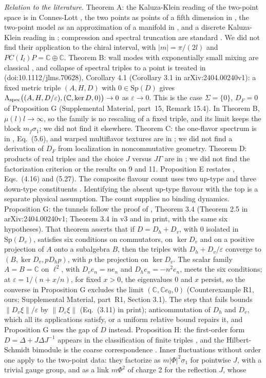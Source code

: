 \documentclass[aps,prd,reprint,onecolumn,nofootinbib,amsmath,amssymb,floatfix]{revtex4-2}
\theoremstyle{plain}
\newcommand{\supp}[1]{Supplemental Material, part~#1}
\newcommand{\Lspec}{\Lambda_{\rm spec}}
\newcommand{\C}{\mathbb C}
\begin{document}
\emph{Relation to the literature.} Theorem A: the Kaluza-Klein reading of the two-point space is in Connes-Lott \cite{ConnesLott1991}, the two points as points of a fifth dimension in \cite{VW1996}, the two-point model as an approximation of a manifold in \cite{DMH1994}, and a discrete Kaluza-Klein reading in \cite{MW2002}; compression and spectral truncation are standard \cite{DLM2014,CvS2021}. We did not find their application to the chiral interval, with $|m|=\pi/(2l)$ and $PC(I_l)P=\C\oplus\C$. Theorem B: wall modes with exponentially small mixing are classical \cite{JR1976,Kaplan1992,Shamir1993}, and collapse of spectral triples to a point is treated in \cite{FL2026} (doi:10.1112/jlms.70628), Corollary 4.1 (Corollary 3.1 in arXiv:2404.00240v1): a fixed metric triple $(A,H,D)$ with $0\in\mathrm{Sp}(D)$ gives $\Lspec\bigl((A,H,D/\varepsilon),(\C,\ker D,0)\bigr)\to0$ as $\varepsilon\to0$. This is the case $\Sigma=\{0\}$, $D_F=0$ of Proposition G (\supp{15}, Remark 15.4). In Theorem B, $\mu(l)l\to\infty$, so the family is no rescaling of a fixed triple, and its limit keeps the block $m_f\sigma_1$; we did not find it elsewhere. Theorem C: the one-flavor spectrum is in \cite{Csaki2004}, Eq.~(5.6), and warped multiflavor textures are in \cite{Cas2008}; we did not find a derivation of $D_F$ from localization in noncommutative geometry. Theorem D: products of real triples and the choice $J$ versus $J\Gamma$ are in \cite{DD2011,VdSS2012}; we did not find the factorization criterion or the results on 9 and 11. Proposition E restates \cite{CCM2007}, Eqs.~(4.16) and (5.27). The composite flavour count uses two up-type and three down-type constituents \cite{Rivero2005}. Identifying the absent up-type flavour with the top is a separate physical assumption. The count supplies no binding dynamics. Proposition G: the tunnels follow the proof of \cite{FL2026}, Theorem 3.4 (Theorem 2.5 in arXiv:2404.00240v1; Theorem 3.4 in v3 and in print, with the same six hypotheses). That theorem asserts that if $D=D_h+D_v$, with $0$ isolated in $\mathrm{Sp}(D_v)$, satisfies six conditions on commutators, on $\ker D_v$ and on a positive projection of $A$ onto a subalgebra $B$, then the triples with $D_h+D_v/\varepsilon$ converge to $(B,\ker D_v,pD_hp)$, with $p$ the projection on $\ker D_v$. The scalar family $A=B=\C$ on $\ell^2$, with $D_ve_n=ne_n$ and $D_he_n=-n^2e_n$, meets the six conditions; at $\varepsilon=1/(n+x/n)$, for fixed $x>0$, the eigenvalues $0$ and $x$ persist, so the converse in Proposition G excludes the limit $(\C,\C e_0,0)$ (Counterexample R1, ours; \supp{R1}, Section 3.1). The step that fails bounds $\|D_v\xi\|/\varepsilon$ by $\|D_\varepsilon\xi\|$ (Eq.~(3.11) in print); anticommutation of $D_h$ and $D_v$, which all its applications satisfy, or a uniform relative bound repairs it, and Proposition G uses the gap of $D$ instead. Proposition H: the first-order form $D=\Delta+J\Delta J^{-1}$ appears in the classification of finite triples \cite{Krajewski1998,PS1998}, and the Hilbert-Schmidt bimodule is the coarse correspondence \cite{Connes1994}. Inner fluctuations without order one \cite{CCvS2013a,CCvS2013b} apply to the two-point data: they factorize as $m|\Phi|^2\sigma_1$ for pointwise $J$, with a trivial gauge group, and as a link $m\Phi^2$ of charge 2 for the reflection $J$, whose 
\end{document}
